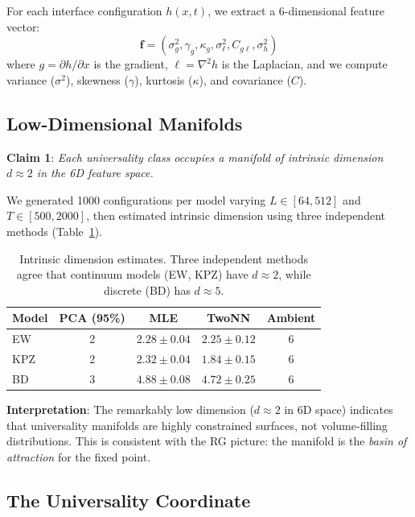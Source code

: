 \documentclass[aps,pre,twocolumn,superscriptaddress,showpacs,longbibliography]{revtex4-2}
\begin{document}
For each interface configuration $h(x,t)$, we extract a 6-dimensional feature vector:
\begin{equation}
\mathbf{f} = (\sigma_g^2, \gamma_g, \kappa_g, \sigma_\ell^2, C_{g\ell}, \sigma_h^2)
\label{eq:features}
\end{equation}
where $g = \partial h/\partial x$ is the gradient, $\ell = \nabla^2 h$ is the Laplacian, and we compute variance ($\sigma^2$), skewness ($\gamma$), kurtosis ($\kappa$), and covariance ($C$).

\subsection{Low-Dimensional Manifolds}

\textbf{Claim 1}: \emph{Each universality class occupies a manifold of intrinsic dimension $d \approx 2$ in the 6D feature space.}

We generated 1000 configurations per model varying $L \in [64, 512]$ and $T \in [500, 2000]$, then estimated intrinsic dimension using three independent methods (Table~\ref{tab:dimension}).

\begin{table}[h]
\caption{Intrinsic dimension estimates. Three independent methods agree that continuum models (EW, KPZ) have $d \approx 2$, while discrete (BD) has $d \approx 5$.}
\label{tab:dimension}
\begin{ruledtabular}
\begin{tabular}{lcccc}
Model & PCA (95\%) & MLE & TwoNN & Ambient \\
\hline
EW & 2 & $2.28 \pm 0.04$ & $2.25 \pm 0.12$ & 6 \\
KPZ & 2 & $2.32 \pm 0.04$ & $1.84 \pm 0.15$ & 6 \\
BD & 3 & $4.88 \pm 0.08$ & $4.72 \pm 0.25$ & 6 \\
\end{tabular}
\end{ruledtabular}
\end{table}

\textbf{Interpretation}: The remarkably low dimension ($d \approx 2$ in 6D space) indicates that universality manifolds are highly constrained surfaces, not volume-filling distributions. This is consistent with the RG picture: the manifold is the \emph{basin of attraction} for the fixed point.

\subsection{The Universality Coordinate}
\end{document}
